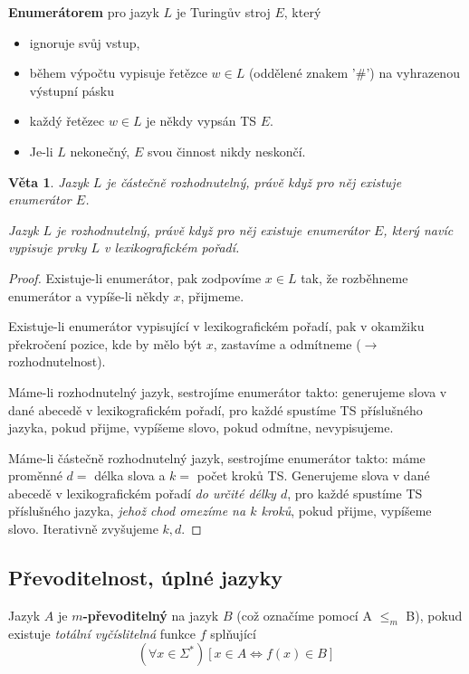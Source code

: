 \documentclass[11pt]{report} %
\newtheorem{theorem}{Věta}[section]
\numberwithin{equation}{section}
\begin{document}
\textbf{Enumerátorem} pro jazyk $L$ je Turingův stroj $E$, který
\begin{itemize}
	
	
	\item ignoruje svůj vstup,
	\item během výpočtu vypisuje řetězce $w \in L$ (oddělené znakem	'$\#$') na vyhrazenou výstupní pásku
	\item každý řetězec $w \in L$ je někdy vypsán TS $E$.
	\item Je-li $L$ nekonečný, $E$ svou činnost nikdy neskončí.
\end{itemize}

\begin{theorem}
Jazyk $L$ je \textit{částečně rozhodnutelný}, právě když pro něj existuje enumerátor $E$.

Jazyk $L$ je \textit{rozhodnutelný}, právě když pro něj existuje enumerátor $E$, který navíc vypisuje prvky $L$ v \textit{lexikografickém pořadí}.
\end{theorem}
\begin{proof}
Existuje-li enumerátor, pak zodpovíme $x \in L$ tak, že rozběhneme enumerátor a vypíše-li někdy $x$, přijmeme.

Existuje-li enumerátor vypisující v lexikografickém pořadí, pak v okamžiku překročení pozice, kde by mělo být $x$, zastavíme a odmítneme ($\rightarrow$ rozhodnutelnost).

Máme-li rozhodnutelný jazyk, sestrojíme enumerátor takto: generujeme slova v dané abecedě v lexikografickém pořadí, pro každé spustíme TS příslušného jazyka, pokud přijme, vypíšeme slovo, pokud odmítne, nevypisujeme.

Máme-li částečně rozhodnutelný jazyk, sestrojíme enumerátor takto: máme proměnné $d =$ délka slova a $k = $ počet kroků TS. Generujeme slova v dané abecedě v lexikografickém pořadí \textit{do určité délky $d$}, pro každé spustíme TS příslušného jazyka, \textit{jehož chod omezíme na $k$ kroků}, pokud přijme, vypíšeme slovo. Iterativně zvyšujeme $k, d$.
\end{proof}


\subsection{Převoditelnost, úplné jazyky}
Jazyk $A$ je \textbf{$m$-převoditelný} na jazyk $B$ (což označíme pomocí A $\leq_m$ B), pokud existuje \textit{totální vyčíslitelná} funkce $f$ splňující
$$(\forall x \in \Sigma^*)[x \in A \Leftrightarrow f(x) \in B]$$
\end{document}
